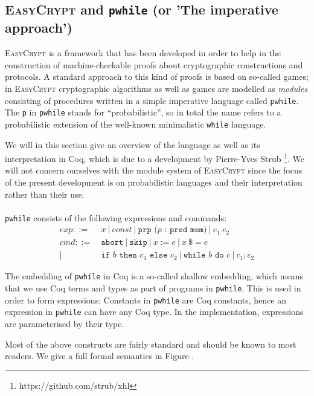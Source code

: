 \documentclass[11pt, leqno, titlepage]{article}
\theoremstyle{definition}
\begin{document}
\subsection{\textsc{EasyCrypt} and \texttt{pwhile} (or 'The imperative approach')}\label{sec:pwhile}
\textsc{EasyCrypt} is a framework that has been developed in order to help in the
construction of machine-checkable proofs about cryptographic constructions and
protocols. %
A standard approach to this kind of proofs is based on so-called games; in
\textsc{EasyCrypt} cryptographic algorithms as well as games are modelled as
\textit{modules} consisting of procedures written in a simple imperative language
called \texttt{pwhile}. The \texttt{p} in \texttt{pwhile} stands for
``probabilistic'', so in total the name refers to a probabilistic extension of the
well-known minimalistic \texttt{while} language.

We will in this section give an overview of the language as well as its
interpretation in Coq, which is due to a development by Pierre-Yves Strub
\footnote{https://github.com/strub/xhl}. We will not concern ourselves with the
module system of \textsc{EasyCrypt} since the focus of the present development is
on probabilistic languages and their interpretation rather than their use.\\
\\
\texttt{pwhile} consists of the following expressions and commands: 
\begin{align*}
  exp ::=~& x ~\vert ~ const ~\vert ~ \texttt{prp ($p$ : pred mem)}~\vert ~ e_1\ e_2\\
  cmd ::=~& \texttt{abort} ~\vert ~ \texttt{skip} ~\vert ~ x := e ~\vert ~ x\ \$= e\\
  \vert ~ & \texttt{if } b \texttt{ then } c_1 \texttt{ else } c_2 ~\vert ~
            \texttt{while } b \texttt{ do } c ~\vert ~ c_1 ; c_2
\end{align*}

The embedding of \texttt{pwhile} in Coq is a so-called shallow embedding, which means
that we use Coq terms and types as part of programs in \texttt{pwhile}. This is used
in order to form expressions: Constants in \texttt{pwhile} are Coq constants, hence
an expression in \texttt{pwhile} can have any Coq type. In the implementation,
expressions are parameterised by their type.

Most of the above constructs are fairly standard and should be known to most
readers. We give a full formal semantics in Figure .
\end{document}

